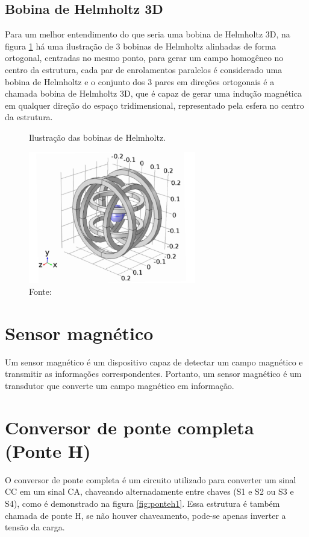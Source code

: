 \subsection{Bobina de Helmholtz 3D}

Para um melhor entendimento do que seria uma bobina de Helmholtz 3D, na figura \ref{fig:bob3d} há uma ilustração de 3 bobinas de Helmholtz alinhadas de forma ortogonal, centradas no mesmo ponto, para gerar um campo homogêneo no centro da estrutura, cada par de enrolamentos paralelos é considerado uma bobina de Helmholtz e o conjunto dos 3 pares em direções ortogonais é a chamada bobina de Helmholtz 3D, que é capaz de gerar uma indução magnética em qualquer direção do espaço tridimensional, representado pela esfera no centro da estrutura.

\begin{figure}[H]
    \centering
     \caption{Ilustração das bobinas de Helmholtz.}
     \includegraphics[width=0.65\textwidth]{./img/3dHMC.png}
     \caption*{Fonte: \cite{3dHelm}}
     \label{fig:bob3d}
\end{figure}

\section{Sensor magnético}

Um sensor magnético é um dispositivo capaz de detectar um campo magnético e transmitir as informações correspondentes. Portanto, um sensor magnético é um transdutor que converte um campo magnético em informação.\cite{popovic2003hall}

\section{Conversor de ponte completa (Ponte H)}
O conversor de ponte completa é um circuito utilizado para converter um sinal CC em um sinal CA, chaveando alternadamente entre chaves (S1 e S2 ou S3 e S4), como é demonstrado na figura \ref{fig:ponteh1}. Essa estrutura é também chamada de ponte H, se não houver chaveamento, pode-se apenas inverter a tensão da carga. \cite{hart2011power}

